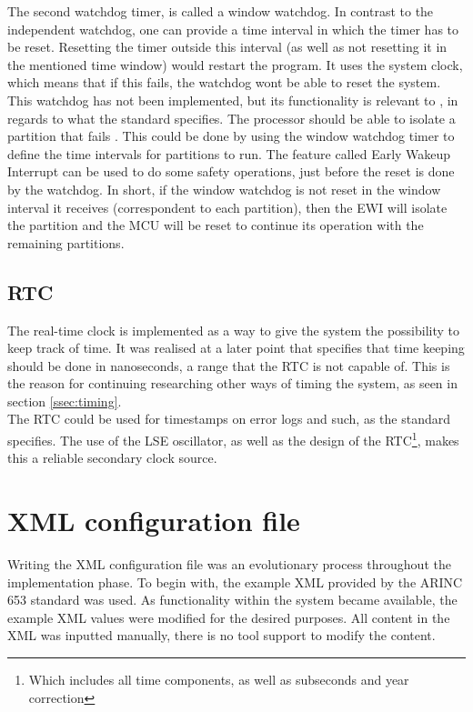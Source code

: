 The second watchdog timer, is called a window watchdog.
In contrast
to the independent watchdog, one can provide a time interval in which
the timer has to be reset. Resetting the timer outside this interval
(as well as not resetting it in the mentioned time window) would restart
the program. It uses the system clock, which means that if this fails,
the watchdog won\textquotesingle t be able to reset the system. This
watchdog has not been implemented, but its functionality is relevant
to \OSname{}, in regards to what the standard specifies. The processor should be able
to isolate a partition that fails \cite{arinc_page_12}. This could be done by
using the window watchdog timer to define the time intervals for partitions
to run. The feature called Early Wakeup Interrupt can be used to do some
safety operations, just before the reset is done by the watchdog\cite{reference_manual_716}.
In short, if the window watchdog is not reset in the window interval it
receives (correspondent to each partition), then the EWI will isolate the
partition and the MCU will be reset to continue its operation
with the remaining partitions.


\subsection{RTC}
The real-time clock is implemented as a way to give the system the
possibility to keep track of time. It was realised at a later point
that \arinc{} specifies that time keeping should be done in nanoseconds,
a range that the RTC is not capable of. This is the reason for continuing
researching other ways of timing the system, as seen in section
\ref{ssec:timing}.\\

The RTC could be used for timestamps on error logs and such,
as the standard specifies\cite{arinc_page_26}. The use of the LSE oscillator,
as well as the design of the RTC\footnote{Which includes all time components, as well as
subseconds and year correction}, makes this a reliable
secondary clock source.


\section{XML configuration file}
Writing the XML configuration file was an evolutionary process throughout the implementation phase.
To begin with, the example XML provided by the ARINC 653 standard was used.
As functionality within the system became available,
the example XML values were modified for the desired purposes.
All content in the XML was inputted manually, there is no tool support to modify the content.



